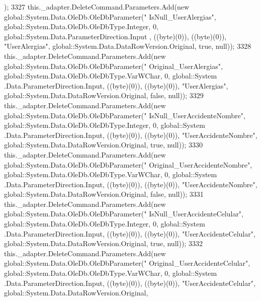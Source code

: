 \begin{DoxyCode}
      );
3327             this.\_adapter.DeleteCommand.Parameters.Add(\textcolor{keyword}{new} global::System.Data.OleDb.OleDbParameter(\textcolor{stringliteral}{"
      IsNull\_UserAlergias"}, global::System.Data.OleDb.OleDbType.Integer, 0, global::System.Data.ParameterDirection.Input
      , ((byte)(0)), ((byte)(0)), \textcolor{stringliteral}{"UserAlergias"}, global::System.Data.DataRowVersion.Original, \textcolor{keyword}{true}, null));
3328             this.\_adapter.DeleteCommand.Parameters.Add(\textcolor{keyword}{new} global::System.Data.OleDb.OleDbParameter(\textcolor{stringliteral}{"
      Original\_UserAlergias"}, global::System.Data.OleDb.OleDbType.VarWChar, 0, global::System
      .Data.ParameterDirection.Input, ((byte)(0)), ((byte)(0)), \textcolor{stringliteral}{"UserAlergias"}, global::System.Data.DataRowVersion.Original, \textcolor{keyword}{false}, null));
3329             this.\_adapter.DeleteCommand.Parameters.Add(\textcolor{keyword}{new} global::System.Data.OleDb.OleDbParameter(\textcolor{stringliteral}{"
      IsNull\_UserAccidenteNombre"}, global::System.Data.OleDb.OleDbType.Integer, 0, global::System
      .Data.ParameterDirection.Input, ((byte)(0)), ((byte)(0)), \textcolor{stringliteral}{"UserAccidenteNombre"}, global::System.Data.DataRowVersion.Original, \textcolor{keyword}{true},
       null));
3330             this.\_adapter.DeleteCommand.Parameters.Add(\textcolor{keyword}{new} global::System.Data.OleDb.OleDbParameter(\textcolor{stringliteral}{"
      Original\_UserAccidenteNombre"}, global::System.Data.OleDb.OleDbType.VarWChar, 0, global::System
      .Data.ParameterDirection.Input, ((byte)(0)), ((byte)(0)), \textcolor{stringliteral}{"UserAccidenteNombre"}, global::System.Data.DataRowVersion.Original, \textcolor{keyword}{
      false}, null));
3331             this.\_adapter.DeleteCommand.Parameters.Add(\textcolor{keyword}{new} global::System.Data.OleDb.OleDbParameter(\textcolor{stringliteral}{"
      IsNull\_UserAccidenteCelular"}, global::System.Data.OleDb.OleDbType.Integer, 0, global::System
      .Data.ParameterDirection.Input, ((byte)(0)), ((byte)(0)), \textcolor{stringliteral}{"UserAccidenteCelular"}, global::System.Data.DataRowVersion.Original, \textcolor{keyword}{
      true}, null));
3332             this.\_adapter.DeleteCommand.Parameters.Add(\textcolor{keyword}{new} global::System.Data.OleDb.OleDbParameter(\textcolor{stringliteral}{"
      Original\_UserAccidenteCelular"}, global::System.Data.OleDb.OleDbType.VarWChar, 0, global::System
      .Data.ParameterDirection.Input, ((byte)(0)), ((byte)(0)), \textcolor{stringliteral}{"UserAccidenteCelular"}, global::System.Data.DataRowVersion.Original, \textcolor{keyword}{
}
\end{DoxyCode}
